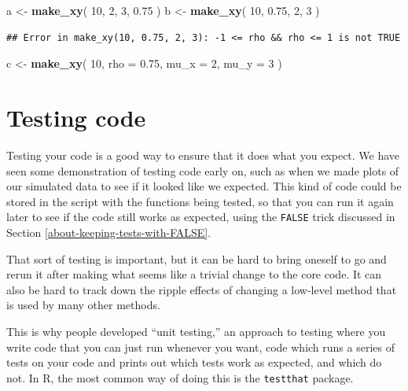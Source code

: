 \documentclass[
]{book}
\newenvironment{Shaded}{\begin{snugshade}}{\end{snugshade}}
\newcommand{\AttributeTok}[1]{\textcolor[rgb]{0.13,0.29,0.53}{#1}}
\newcommand{\DecValTok}[1]{\textcolor[rgb]{0.00,0.00,0.81}{#1}}
\newcommand{\FloatTok}[1]{\textcolor[rgb]{0.00,0.00,0.81}{#1}}
\newcommand{\FunctionTok}[1]{\textcolor[rgb]{0.13,0.29,0.53}{\textbf{#1}}}
\newcommand{\NormalTok}[1]{#1}
\newcommand{\OtherTok}[1]{\textcolor[rgb]{0.56,0.35,0.01}{#1}}
\begin{document}
\begin{Shaded}
\begin{Highlighting}[]
\NormalTok{a }\OtherTok{\textless{}{-}} \FunctionTok{make\_xy}\NormalTok{( }\DecValTok{10}\NormalTok{, }\DecValTok{2}\NormalTok{, }\DecValTok{3}\NormalTok{, }\FloatTok{0.75}\NormalTok{ )}
\NormalTok{b }\OtherTok{\textless{}{-}} \FunctionTok{make\_xy}\NormalTok{( }\DecValTok{10}\NormalTok{, }\FloatTok{0.75}\NormalTok{, }\DecValTok{2}\NormalTok{, }\DecValTok{3}\NormalTok{ )}
\end{Highlighting}
\end{Shaded}

\begin{verbatim}
## Error in make_xy(10, 0.75, 2, 3): -1 <= rho && rho <= 1 is not TRUE
\end{verbatim}

\begin{Shaded}
\begin{Highlighting}[]
\NormalTok{c }\OtherTok{\textless{}{-}} \FunctionTok{make\_xy}\NormalTok{( }\DecValTok{10}\NormalTok{, }\AttributeTok{rho =} \FloatTok{0.75}\NormalTok{, }\AttributeTok{mu\_x =} \DecValTok{2}\NormalTok{, }\AttributeTok{mu\_y =} \DecValTok{3}\NormalTok{ )}
\end{Highlighting}
\end{Shaded}

\section{Testing code}\label{testing-code}

Testing your code is a good way to ensure that it does what you expect.
We have seen some demonstration of testing code early on, such as when we made plots of our simulated data to see if it looked like we expected.
This kind of code could be stored in the script with the functions being tested, so that you can run it again later to see if the code still works as expected, using the \texttt{FALSE} trick discussed in Section \ref{about-keeping-tests-with-FALSE}.

That sort of testing is important, but it can be hard to bring oneself to go and rerun it after making what seems like a trivial change to the core code.
It can also be hard to track down the ripple effects of changing a low-level method that is used by many other methods.

This is why people developed ``unit testing,'' an approach to testing where you write code that you can just run whenever you want, code which runs a series of tests on your code and prints out which tests work as expected, and which do not.
In R, the most common way of doing this is the \texttt{testthat} package.
\end{document}
